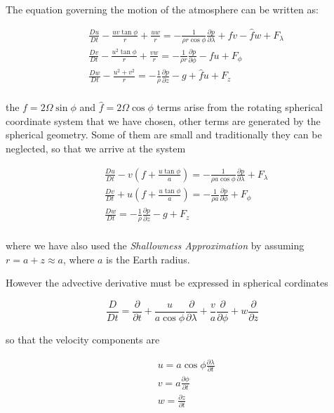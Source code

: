 The equation governing the motion of the atmosphere can be written as:

\[\begin{aligned}
&\frac{D u}{Dt} -\frac{uv \tan{\phi}}{r} +  \frac{uw}{r} = -\frac{1}{\rho r \cos{\phi}}\frac{\partial p}{\partial \lambda} + fv - \hat{f}w + F_\lambda\\
&\frac{D v}{Dt} -\frac{u^2 \tan{\phi}}{r} +  \frac{vw}{r} = -\frac{1}{\rho r }\frac{\partial p}{\partial \phi} - fu  + F_\phi\\
&\frac{D w}{Dt} -\frac{u^2+v^2}{r} = -\frac{1}{\rho }\frac{\partial p}{\partial z} -g +\hat{f}u + F_z\\
\end{aligned}\]

the \(f=2\Omega \sin{\phi}\) and \(\hat{f} = 2\Omega\cos{\phi}\) terms
arise from the rotating spherical coordinate system that we have chosen,
other terms are generated by the spherical geometry. Some of them are
small and traditionally they can be neglected, so that we arrive at the
system

\[\begin{aligned}
&\frac{D u}{Dt} - v\left(f +  \frac{u \tan{\phi}}{a}\right)  = -\frac{1}{\rho a \cos{\phi}}\frac{\partial p}{\partial \lambda}   + F_\lambda\\
&\frac{D v}{Dt} + u\left( f + \frac{u \tan{\phi}}{a}\right)  = -\frac{1}{\rho a}\frac{\partial p}{\partial \phi}  + F_\phi\\
&\frac{D w}{Dt}  = -\frac{1}{\rho }\frac{\partial p}{\partial z} -g  + F_z\\
\end{aligned}\]

where we have also used the \emph{Shallowness Approximation} by assuming
\(r = a +z \approx a\), where \(a\) is the Earth radius.

However the advective derivative must be expressed in spherical
cordinates

\[\frac{D }{Dt} = \frac{\partial }{\partial t} + \frac{u}{a\cos{\phi}}\frac{\partial }{\partial \lambda} +\frac{v}{a}\frac{\partial }{\partial \phi} + w\frac{\partial }{\partial z}\]

so that the velocity components are

\[\begin{aligned}
&u = a\cos{\phi\frac{\partial \lambda}{\partial t}}\\
&v = a \frac{\partial \phi}{\partial t}\\
&w = \frac{\partial z}{\partial t}
\end{aligned}\]

